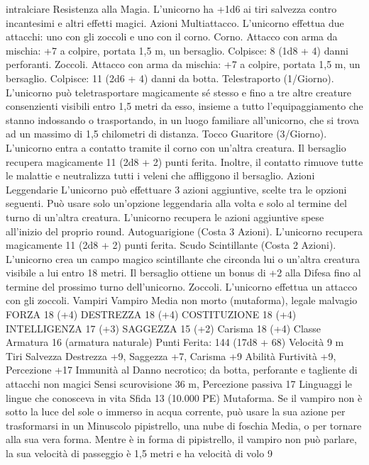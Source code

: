 \begin{multicols}{2}
intralciare
Resistenza alla Magia. L’unicorno ha +1d6 ai tiri salvezza
contro incantesimi e altri effetti magici.
Azioni
Multiattacco. L’unicorno effettua due attacchi: uno con gli
zoccoli e uno con il corno.
Corno. Attacco con arma da mischia: +7 a colpire, portata 1,5 m,
un bersaglio.
Colpisce: 8 (1d8 + 4) danni perforanti.
Zoccoli. Attacco con arma da mischia: +7 a colpire, portata 1,5
m, un bersaglio.
Colpisce: 11 (2d6 + 4) danni da botta.
Telestraporto (1/Giorno). L’unicorno può teletrasportare
magicamente sé stesso e fino a tre altre creature consenzienti
visibili entro 1,5 metri da esso, insieme a tutto
l’equipaggiamento che stanno indossando o trasportando, in un
luogo familiare all’unicorno, che si trova ad un massimo di 1,5
chilometri di distanza.
Tocco Guaritore (3/Giorno). L’unicorno entra a contatto tramite
il corno con un’altra creatura. Il bersaglio recupera magicamente
11 (2d8 + 2) punti ferita. Inoltre, il contatto rimuove tutte le
malattie e neutralizza tutti i veleni che affliggono il bersaglio.
Azioni Leggendarie
L’unicorno può effettuare 3 azioni aggiuntive, scelte tra le
opzioni seguenti. Può usare solo un’opzione leggendaria alla
volta e solo al termine del turno di un’altra creatura. L’unicorno
recupera le azioni aggiuntive spese all’inizio del proprio round.
Autoguarigione (Costa 3 Azioni). L’unicorno recupera
magicamente 11 (2d8 + 2) punti ferita.
Scudo Scintillante (Costa 2 Azioni). L’unicorno crea un campo
magico scintillante che circonda lui o un’altra creatura visibile a lui
entro 18 metri. Il bersaglio ottiene un bonus di +2 alla Difesa fino al
termine del prossimo turno dell’unicorno.
Zoccoli. L’unicorno effettua un attacco con gli zoccoli.
Vampiri
Vampiro
Media non morto (mutaforma), legale malvagio
FORZA 18 (+4)
DESTREZZA 18 (+4)
COSTITUZIONE 18 (+4)
INTELLIGENZA 17 (+3)
SAGGEZZA 15 (+2)
Carisma 18 (+4)
Classe Armatura 16 (armatura naturale)
\hspace*{0pt}\hfill{Punti Ferita}: 144 (17d8 + 68)
Velocità 9 m
Tiri Salvezza Destrezza +9, Saggezza +7, Carisma +9
Abilità Furtività +9, Percezione +17
Immunità al Danno necrotico; da botta, perforante e
tagliente di attacchi non magici
Sensi scurovisione 36 m, Percezione passiva 17
Linguaggi le lingue che conosceva in vita
Sfida 13 (10.000 PE)
Mutaforma. Se il vampiro non è sotto la luce del sole o immerso
in acqua corrente, può usare la sua azione per trasformarsi in un
Minuscolo pipistrello, una nube di foschia Media, o per tornare
alla sua vera forma.
Mentre è in forma di pipistrello, il vampiro non può parlare, la
sua velocità di passeggio è 1,5 metri e ha velocità di volo 9

\end{multicols}
